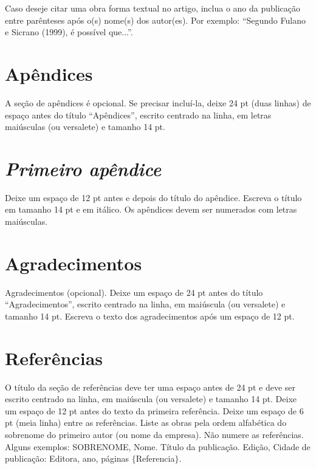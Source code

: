 \documentclass[
	article,			%
	12pt,				%
	oneside,			%
	a4paper,			%
	english,			%
	brazil,				%
	sumario=tradicional
	]{abntex2}
\begin{document}
Caso deseje citar uma obra forma textual no artigo, inclua o ano da publicação entre parênteses após o(s) nome(s) dos autor(es).  Por exemplo: “Segundo Fulano e Sicrano (1999), é possível que...”.



\appendix
\section*{Apêndices}
 
A seção de apêndices é opcional.  Se precisar incluí-la, deixe 24 pt (duas linhas) de espaço antes do título “Apêndices”,  escrito centrado na linha, em letras maiúsculas (ou versalete) e tamanho 14 pt.
 
\renewcommand{\thesection}{\textit{\Alph{section}} }
\section{\textit{Primeiro apêndice}}
 
Deixe um espaço de 12 pt antes e depois do título do apêndice.  Escreva o título em tamanho 14 pt e em itálico.  Os apêndices devem ser numerados com letras maiúsculas.


\section*{Agradecimentos}

Agradecimentos (opcional).  Deixe um espaço de 24 pt antes do título “Agradecimentos”, escrito centrado na linha, em maiúscula (ou versalete) e tamanho 14 pt.  Escreva o texto dos agradecimentos após um espaço de 12 pt.

\section*{Referências}

O título da seção de referências deve ter uma espaço antes de 24 pt e deve ser escrito centrado na linha, em maiúscula (ou versalete) e tamanho 14 pt.  Deixe um espaço de 12 pt antes do texto da primeira referência.  Deixe um espaço de 6 pt (meia linha) entre as referências.
Liste as obras pela ordem alfabética do sobrenome do primeiro autor (ou nome da empresa).  Não numere as referências.  Alguns exemplos:
SOBRENOME, Nome. Título da publicação.  Edição, Cidade de publicação: Editora, ano, páginas $\{ $Referencia$\} $.
\end{document}
